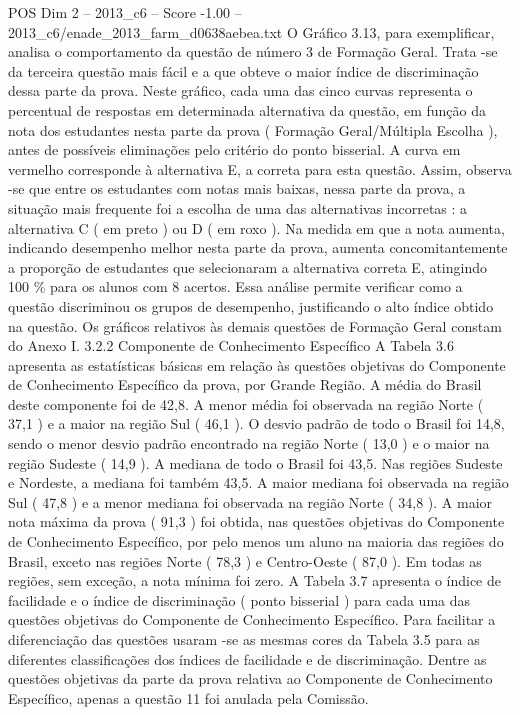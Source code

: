 \begin{textsample}{POS Dim 2 – 2013\_c6 – Score -1.00 – 2013\_c6/enade\_2013\_farm\_d0638aebea.txt}
O Gráfico 3.13, para exemplificar, analisa o comportamento da questão de número 3 de Formação Geral.
Trata -se da terceira questão mais fácil e a que obteve o maior índice de discriminação dessa parte da prova.
Neste gráfico, cada uma das cinco curvas representa o percentual de respostas em determinada alternativa da questão, em função da nota dos estudantes nesta parte da prova ( Formação Geral/Múltipla Escolha ), antes de possíveis eliminações pelo critério do ponto bisserial.
A curva em vermelho corresponde à alternativa E, a correta para esta questão.
Assim, observa -se que entre os estudantes com notas mais baixas, nessa parte da prova, a situação mais frequente foi a escolha de uma das alternativas incorretas : a alternativa C ( em preto ) ou D ( em roxo ).
Na medida em que a nota aumenta, indicando desempenho melhor nesta parte da prova, aumenta concomitantemente a proporção de estudantes que selecionaram a alternativa correta E, atingindo 100 \% para os alunos com 8 acertos.
Essa análise permite verificar como a questão discriminou os grupos de desempenho, justificando o alto índice obtido na questão.
Os gráficos relativos às demais questões de Formação Geral constam do Anexo I. 3.2.2 Componente de Conhecimento Específico A Tabela 3.6 apresenta as estatísticas básicas em relação às questões objetivas do Componente de Conhecimento Específico da prova, por Grande Região.
A média do Brasil deste componente foi de 42,8.
A menor média foi observada na região Norte ( 37,1 ) e a maior na região Sul ( 46,1 ).
O desvio padrão de todo o Brasil foi 14,8, sendo o menor desvio padrão encontrado na região Norte ( 13,0 ) e o maior na região Sudeste ( 14,9 ).
A mediana de todo o Brasil foi 43,5.
Nas regiões Sudeste e Nordeste, a mediana foi também 43,5.
A maior mediana foi observada na região Sul ( 47,8 ) e a menor mediana foi observada na região Norte ( 34,8 ).
A maior nota máxima da prova ( 91,3 ) foi obtida, nas questões objetivas do Componente de Conhecimento Específico, por pelo menos um aluno na maioria das regiões do Brasil, exceto nas regiões Norte ( 78,3 ) e Centro-Oeste ( 87,0 ).
Em todas as regiões, sem exceção, a nota mínima foi zero.
A Tabela 3.7 apresenta o índice de facilidade e o índice de discriminação ( ponto bisserial ) para cada uma das questões objetivas do Componente de Conhecimento Específico.
Para facilitar a diferenciação das questões usaram -se as mesmas cores da Tabela 3.5 para as diferentes classificações dos índices de facilidade e de discriminação.
Dentre as questões objetivas da parte da prova relativa ao Componente de Conhecimento Específico, apenas a questão 11 foi anulada pela Comissão.

\end{textsample}
